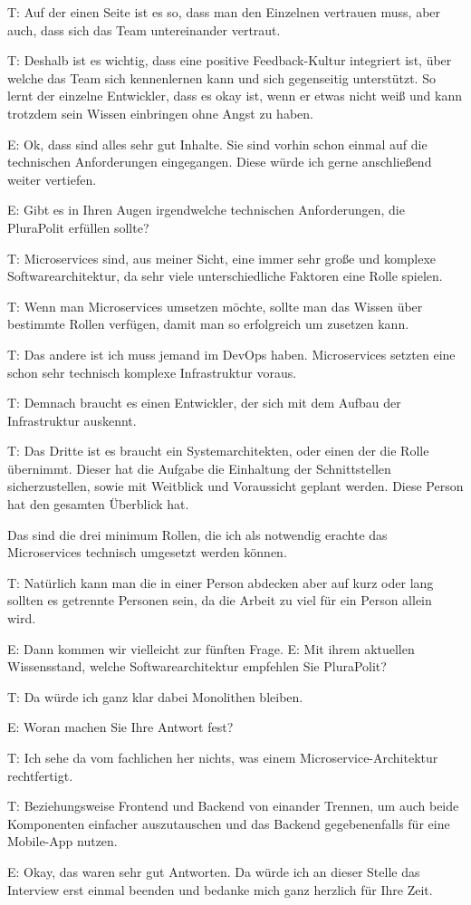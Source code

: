  \label{appendix:t-29}
T: Auf der einen Seite ist es so, dass man den  Einzelnen vertrauen muss, aber auch, dass sich das Team untereinander vertraut.

 \label{appendix:t-30}
T: Deshalb ist es wichtig, dass eine positive Feedback-Kultur integriert ist, über welche das Team sich kennenlernen kann und sich gegenseitig unterstützt. So lernt der einzelne Entwickler, dass es okay ist, wenn er etwas nicht weiß und kann trotzdem sein Wissen einbringen ohne Angst zu haben.

E: Ok, dass sind alles sehr gut Inhalte. Sie sind vorhin schon einmal auf die technischen Anforderungen eingegangen. Diese würde ich gerne anschließend weiter vertiefen.

E: Gibt es in Ihren Augen irgendwelche technischen Anforderungen, die PluraPolit erfüllen sollte? 

T: Microservices sind, aus meiner Sicht, eine immer sehr große und komplexe Softwarearchitektur, da sehr viele unterschiedliche Faktoren eine Rolle spielen.

 \label{appendix:t-31}
T: Wenn man Microservices umsetzen möchte, sollte man das Wissen über bestimmte Rollen verfügen, damit man so erfolgreich um zusetzen kann.

 \label{appendix:t-32}
T: Das andere ist ich muss jemand im DevOps haben. Microservices setzten eine schon sehr technisch komplexe Infrastruktur voraus.

 \label{appendix:t-33}
T: Demnach braucht es einen Entwickler, der sich mit dem Aufbau der Infrastruktur auskennt.

 \label{appendix:t-34}
T:  Das Dritte ist es braucht ein Systemarchitekten, oder einen der die Rolle übernimmt. Dieser hat die Aufgabe die Einhaltung der Schnittstellen sicherzustellen, sowie mit Weitblick und Voraussicht geplant werden. Diese Person hat den gesamten Überblick hat.

 Das sind die drei minimum Rollen, die ich als notwendig erachte das Microservices technisch umgesetzt werden können. 

 \label{appendix:t-35}
T: Natürlich kann man die in einer Person abdecken aber auf kurz oder lang sollten es getrennte Personen sein, da die Arbeit zu viel für ein Person allein wird. 

E: Dann kommen wir vielleicht zur fünften Frage.
E: Mit ihrem aktuellen Wissensstand, welche Softwarearchitektur empfehlen Sie PluraPolit? 

 \label{appendix:t-36}
T: Da würde ich ganz klar dabei Monolithen bleiben.

E: Woran machen Sie Ihre Antwort fest?

 \label{appendix:t-37}
T: Ich sehe da vom fachlichen her nichts, was einem Microservice-Architektur rechtfertigt.

 \label{appendix:t-38}
T: Beziehungsweise Frontend und Backend von einander Trennen, um auch beide Komponenten einfacher auszutauschen und das Backend gegebenenfalls für eine Mobile-App nutzen.

E: Okay, das waren sehr gut Antworten. Da würde ich an dieser Stelle das Interview erst einmal beenden und bedanke mich ganz herzlich für Ihre Zeit.

